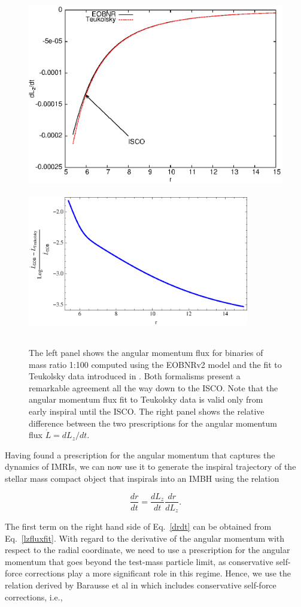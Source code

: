 \begin{figure}[ht]
\centerline{
\includegraphics[height=0.38\textwidth,  clip]{figures/insimri/TEOBLzdot}
\includegraphics[height=2.6in, width=3.8in,  clip]{figures/insimri/teuvseobflux}
}
\caption{The left panel shows the angular momentum flux for binaries of mass ratio 1:100 computed using the EOBNRv2 model and the fit to Teukolsky data introduced in \cite{improved}. Both formalisms present a remarkable agreement all the way down to the ISCO. Note that the angular momentum flux fit to Teukolsky data is valid only from early inspiral until the ISCO. The right panel shows the relative difference between the two prescriptions for the angular momentum flux \(\dot{L}=dL_z/dt\).}
\label{fluxfitheavy}
\end{figure}


Having found a prescription for the angular momentum that captures the dynamics of IMRIs, we can now use it to generate the inspiral trajectory of the stellar mass compact object that inspirals into an IMBH using the relation 

\begin{equation}
\frac{d r}{d t}= \frac{d L_z}{d t}\frac{d r}{d L_z}.
\label{drdt}
\end{equation}

\noindent  The first term on the right hand side of Eq.~\eqref{drdt} can be obtained from Eq.~\eqref{lzfluxfit}. With regard to the derivative of the angular momentum with respect to the radial coordinate, we need to use a prescription for the angular momentum that goes beyond the test-mass particle limit, as conservative self-force corrections play a more significant role in this regime. Hence, we use the relation derived by Barausse et al in \cite{barus} which includes conservative self-force corrections, i.e.,


